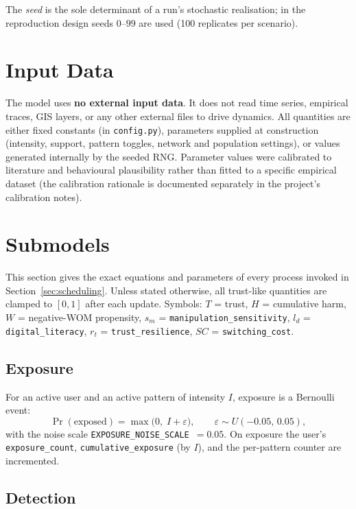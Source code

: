 \documentclass[11pt]{article}
\newcommand{\code}[1]{\texttt{#1}}
\begin{document}
The \emph{seed} is the sole determinant of a run's stochastic realisation; in the
reproduction design seeds $0$--$99$ are used (100 replicates per scenario).

\section{Input Data}
\label{sec:input}

The model uses \textbf{no external input data}. It does not read time series,
empirical traces, GIS layers, or any other external files to drive dynamics. All
quantities are either fixed constants (in \code{config.py}), parameters supplied
at construction (intensity, support, pattern toggles, network and population
settings), or values generated internally by the seeded RNG. Parameter values
were calibrated to literature and behavioural plausibility rather than fitted to a
specific empirical dataset (the calibration rationale is documented separately in
the project's calibration notes).

\section{Submodels}
\label{sec:submodels}

This section gives the exact equations and parameters of every process invoked in
Section~\ref{sec:scheduling}. Unless stated otherwise, all trust-like quantities
are clamped to $[0,1]$ after each update. Symbols: $T$ = trust, $H$ = cumulative
harm, $W$ = negative-WOM propensity, $s_m$ = \code{manipulation\_sensitivity},
$l_d$ = \code{digital\_literacy}, $r_t$ = \code{trust\_resilience},
$SC$ = \code{switching\_cost}.

\subsection{Exposure}
\label{sub:exposure}

For an active user and an active pattern of intensity $I$, exposure is a Bernoulli
event:
\[
\Pr(\text{exposed}) = \max\!\big(0,\; I + \varepsilon\big),
\qquad \varepsilon \sim U(-0.05,\,0.05),
\]
with the noise scale \code{EXPOSURE\_NOISE\_SCALE}~$=0.05$. On exposure the
user's \code{exposure\_count}, \code{cumulative\_exposure} (by $I$), and the
per-pattern counter are incremented.

\subsection{Detection}
\label{sub:detection}
\end{document}

